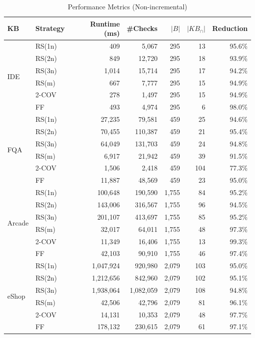 \begin{table}[htbp]
\centering
\caption{Performance Metrics (Non-incremental)}
\label{tab:performance}
\begin{tabular}{llrrrrr}
\toprule
KB & Strategy & Runtime (ms) & \#Checks & $|B|$ & $|KB_\cap|$ & Reduction \\
\midrule
\multirow{6}{*}{IDE}
    & RS(1n) & 409     & 5,067   & 295 & 13  & 95.6\% \\
    & RS(2n) & 849     & 12,720  & 295 & 18  & 93.9\% \\
    & RS(3n) & 1,014   & 15,714  & 295 & 17  & 94.2\% \\
    & RS(m)  & 667     & 7,777   & 295 & 15  & 94.9\% \\
    & 2-COV  & 278     & 1,497   & 295 & 15  & 94.9\% \\
    & FF     & 493     & 4,974   & 295 & 6   & 98.0\% \\
\midrule
\multirow{6}{*}{FQA}
    & RS(1n) & 27,235  & 79,581  & 459 & 25  & 94.6\% \\
    & RS(2n) & 70,455  & 110,387 & 459 & 21  & 95.4\% \\
    & RS(3n) & 64,049  & 131,703 & 459 & 24  & 94.8\% \\
    & RS(m)  & 6,917   & 21,942  & 459 & 39  & 91.5\% \\
    & 2-COV  & 1,506   & 2,418   & 459 & 104 & 77.3\% \\
    & FF     & 11,887  & 48,569  & 459 & 23  & 95.0\% \\
\midrule
\multirow{6}{*}{Arcade}
    & RS(1n) & 100,648 & 190,590 & 1,755 & 84  & 95.2\% \\
    & RS(2n) & 143,006 & 316,567 & 1,755 & 96  & 94.5\% \\
    & RS(3n) & 201,107 & 413,697 & 1,755 & 85  & 95.2\% \\
    & RS(m)  & 32,017  & 64,011  & 1,755 & 48  & 97.3\% \\
    & 2-COV  & 11,349  & 16,406  & 1,755 & 13  & 99.3\% \\
    & FF     & 42,103  & 90,910  & 1,755 & 46  & 97.4\% \\
\midrule
\multirow{6}{*}{eShop}
    & RS(1n) & 1,047,924 & 920,980   & 2,079 & 103 & 95.0\% \\
    & RS(2n) & 1,212,656 & 842,960   & 2,079 & 102 & 95.1\% \\
    & RS(3n) & 1,938,064 & 1,082,059 & 2,079 & 108 & 94.8\% \\
    & RS(m)  & 42,506    & 42,796    & 2,079 & 81  & 96.1\% \\
    & 2-COV  & 14,131    & 10,353    & 2,079 & 48  & 97.7\% \\
    & FF     & 178,132   & 230,615   & 2,079 & 61  & 97.1\% \\
\bottomrule
\end{tabular}
\end{table}

